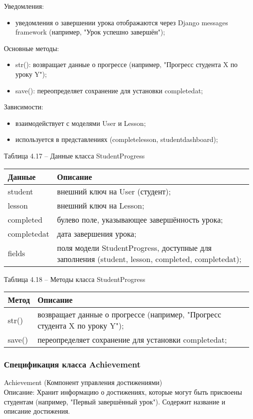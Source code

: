 Уведомления: 
\begin{itemize}
	\item уведомления о завершении урока отображаются через Django messages framework (например, "Урок успешно завершён"); 
\end{itemize}

Основные методы: 
\begin{itemize}
	\item str(): возвращает данные о прогрессе (например, "Прогресс студента X по уроку Y"); 
	\item save(): переопределяет сохранение для установки completedat; 
\end{itemize}

Зависимости: 
\begin{itemize}
	\item взаимодействует с моделями User и Lesson;
	\item используется в представлениях (completelesson, studentdashboard); 
\end{itemize}

Таблица 4.17 – Данные класса StudentProgress \\
\begin{tabular}{|p{4cm}|p{8cm}|}
	\hline
	Данные & Описание \\
	\hline
	student & внешний ключ на User (студент); \\
	lesson & внешний ключ на Lesson; \\
	completed & булево поле, указывающее завершённость урока; \\
	completedat & дата завершения урока; \\
	fields & поля модели StudentProgress, доступные для заполнения (student, lesson, completed, completedat); \\
	\hline
\end{tabular}

Таблица 4.18 – Методы класса StudentProgress \\
\begin{tabular}{|p{4cm}|p{8cm}|}
	\hline
	Метод & Описание \\
	\hline
	str() & возвращает данные о прогрессе (например, "Прогресс студента X по уроку Y"); \\
	save() & переопределяет сохранение для установки completedat; \\
	\hline
\end{tabular}

\subsubsection{Спецификация класса Achievement}
Achievement (Компонент управления достижениями) \\
Описание: Хранит информацию о достижениях, которые могут быть присвоены студентам (например, "Первый завершённый урок"). Содержит название и описание достижения.

